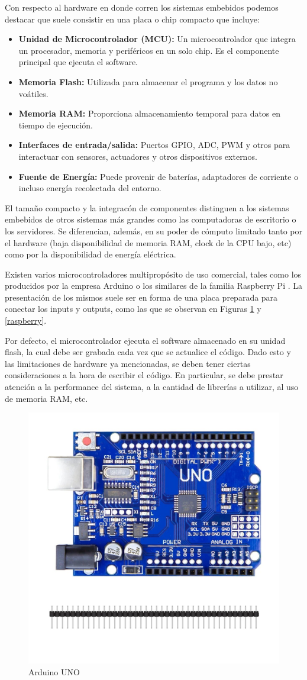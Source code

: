Con respecto al hardware en donde corren los sistemas embebidos podemos destacar que suele consistir en una placa o chip compacto que incluye:
\begin{itemize}
    \item \textbf{Unidad de Microcontrolador (MCU):} Un microcontrolador que integra un procesador, memoria y perif\'ericos en un solo chip. Es el componente principal que ejecuta el software.
    \item \textbf{Memoria Flash:} Utilizada para almacenar el programa y los datos no voátiles.
    \item \textbf{Memoria RAM:} Proporciona almacenamiento temporal para datos en tiempo de ejecución.
    \item \textbf{Interfaces de entrada/salida:} Puertos \gls{GPIO}, \gls{ADC}, \gls{PWM} y otros para interactuar con sensores, actuadores y otros dispositivos externos.
    \item \textbf{Fuente de Energ\'ia:} Puede provenir de bater\'ias, adaptadores de corriente o incluso energ\'ia recolectada del entorno.
\end{itemize}
El tama\~no compacto y la integracón de componentes distinguen a los sistemas embebidos de otros sistemas más grandes como las computadoras de escritorio o los servidores. Se diferencian, además, en su poder de cómputo limitado tanto por el hardware (baja disponibilidad de memoria RAM, \gls{clock} de la CPU bajo, etc) como por la disponibilidad de energía eléctrica.

Existen varios microcontroladores multipropósito de uso comercial, tales como los producidos por la empresa Arduino \cite{arduinoMicro} o los similares de la familia Raspberry Pi \cite{raspMicro}. La presentación de los mismos suele ser en forma de una placa preparada para conectar los inputs y outputs, como las que se observan en Figuras \ref{arduinoUNO} y \ref{raspberry}.

Por defecto, el microcontrolador ejecuta el software almacenado en su unidad flash, la cual debe ser grabada cada vez que se actualice el código. Dado esto y las limitaciones de hardware ya mencionadas, se deben tener ciertas consideraciones a la hora de escribir el código. En particular, se debe prestar atención a la performance del sistema, a la cantidad de librerías a utilizar, al uso de memoria RAM, etc.

\begin{figure}[h!]
	\caption{Arduino UNO}
	\label{arduinoUNO}
	\centering
    \includegraphics[width=0.5\linewidth]{arduinoUNO.jpeg}
\end{figure}


